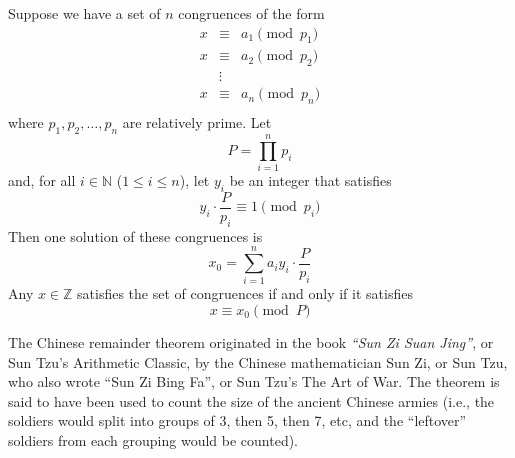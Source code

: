 \documentclass{article}
\begin{document}
Suppose we have a set of $n$ congruences of the form
\[ \begin{array}{ccc}
 x & \equiv & a_1 \pmod{p_1} \\
 x & \equiv & a_2 \pmod{p_2} \\
   & \vdots &  \\
x & \equiv & a_n \pmod{p_n} \\
\end{array} \]
where $p_1, p_2, \dots, p_n$ are relatively prime.  Let
$$P = \prod_{i=1}^n p_i$$
and, for all $i \in \mathbb{N}$ ($1 \leq i \leq n$), let $y_i$ be an integer that satisfies
$$y_i \cdot \frac{P}{p_i} \equiv 1 \pmod{p_i}$$
Then one solution of these congruences is
$$x_0 = \sum_{i=1}^n a_iy_i \cdot \frac{P}{p_i}$$
Any $x \in \mathbb{Z}$ satisfies the set of congruences if and only if it satisfies
\[ x \equiv x_0 \pmod{P} \]

The Chinese remainder theorem originated in the book \emph{``Sun Zi Suan Jing''}, or Sun Tzu's Arithmetic Classic, by the Chinese mathematician Sun Zi, or Sun Tzu, who also wrote ``Sun Zi Bing Fa'', or Sun Tzu's The Art of War.  The theorem is said to have been used to count the size of the ancient Chinese armies (i.e., the soldiers would split into groups of 3, then 5, then 7, etc, and the ``leftover'' soldiers from each grouping would be counted).
\end{document}
